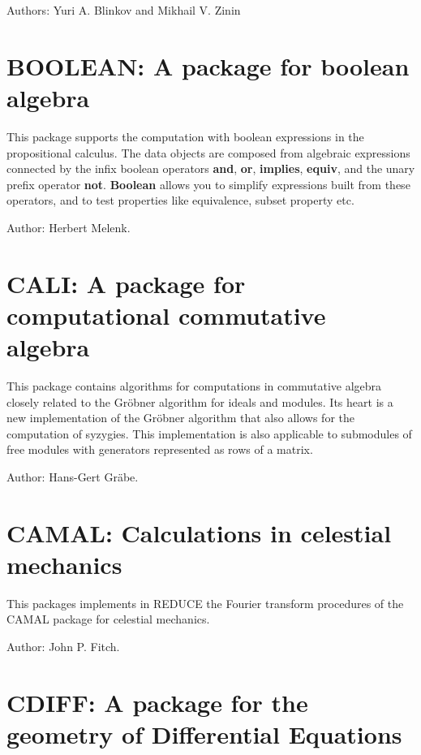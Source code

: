 Authors: Yuri A. Blinkov and Mikhail V. Zinin


\newpage

\section{BOOLEAN: A package for boolean algebra} 

This package supports the computation with boolean expressions in the
propositional calculus.  The data objects are composed from algebraic
expressions connected by the infix boolean operators {\bf and}, {\bf or},
{\bf implies}, {\bf equiv}, and the unary prefix operator {\bf not}.
{\bf Boolean} allows you to simplify expressions built from these
operators, and to test properties like equivalence, subset property etc.

Author: Herbert Melenk.


\newpage

\section{CALI: A package for computational commutative algebra}

This package contains algorithms for computations in commutative algebra
closely related to the Gr\"obner algorithm for ideals and modules.  Its
heart is a new implementation of the Gr\"obner algorithm that also allows
for the computation of syzygies.  This implementation is also applicable to
submodules of free modules with generators represented as rows of a matrix.

Author: Hans-Gert Gr\"abe.


\newpage

\section{CAMAL: Calculations in celestial mechanics} 
\label{CAMAL}

This packages implements in REDUCE the Fourier transform procedures of the
CAMAL package for celestial mechanics.

Author: John P. Fitch.


\newpage

\section{CDIFF: A package for the geometry of Differential Equations}
\label{CDIFF}


